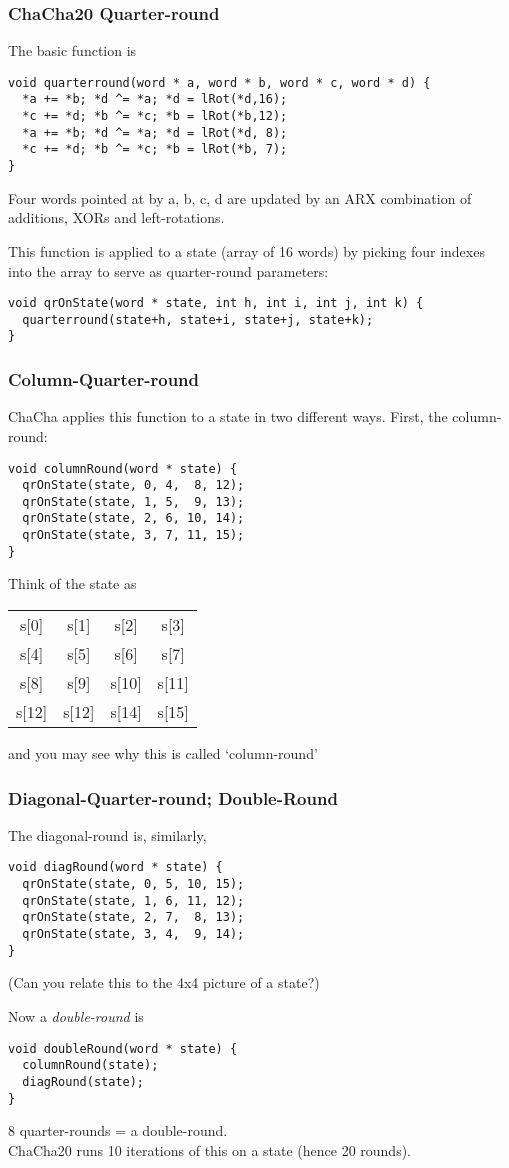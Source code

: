 \documentclass[10pt, hyperref={pdfpagelabels=false}]{beamer}
\begin{document}
\begin{frame} [fragile]
\frametitle{ChaCha20 Quarter-round}
The basic function is
{\color{blue}
\begin{verbatim}
void quarterround(word * a, word * b, word * c, word * d) {
  *a += *b; *d ^= *a; *d = lRot(*d,16);
  *c += *d; *b ^= *c; *b = lRot(*b,12);
  *a += *b; *d ^= *a; *d = lRot(*d, 8);
  *c += *d; *b ^= *c; *b = lRot(*b, 7);
}
\end{verbatim}
}
Four words pointed at by a, b, c, d are updated by an ARX combination of additions, XORs and left-rotations. 

This function is applied to a state (array of 16 words) by picking four indexes into the array to serve as quarter-round parameters:
{\color{blue}
\begin{verbatim}
void qrOnState(word * state, int h, int i, int j, int k) {
  quarterround(state+h, state+i, state+j, state+k);
}
\end{verbatim}
}
\end{frame}

\begin{frame} [fragile]
\frametitle{Column-Quarter-round}
ChaCha applies this function to a state in two different ways. First, the column-round:
{\color{blue}
\begin{verbatim}
void columnRound(word * state) {
  qrOnState(state, 0, 4,  8, 12);
  qrOnState(state, 1, 5,  9, 13);
  qrOnState(state, 2, 6, 10, 14);
  qrOnState(state, 3, 7, 11, 15);
}
\end{verbatim}
}
Think of the state as\\
\begin{tabular}{c c c c} 
s[0] & s[1] & s[2] & s[3]\\
s[4] & s[5] & s[6] & s[7]\\
s[8] & s[9] & s[10] & s[11]\\
s[12] & s[12] & s[14] & s[15]\\
\end{tabular}

and you may see why this is called `column-round'
\end{frame}

\begin{frame} [fragile]
\frametitle{Diagonal-Quarter-round; Double-Round}
The diagonal-round is, similarly,

{\color{blue}
\begin{verbatim}
void diagRound(word * state) {
  qrOnState(state, 0, 5, 10, 15);
  qrOnState(state, 1, 6, 11, 12);
  qrOnState(state, 2, 7,  8, 13);
  qrOnState(state, 3, 4,  9, 14);
}
\end{verbatim}
}
(Can you relate this to the 4x4 picture of a state?)

Now a \emph{double-round} is
{\color{blue}
\begin{verbatim}
void doubleRound(word * state) { 
  columnRound(state);
  diagRound(state);
}
\end{verbatim}
}

8 quarter-rounds = a double-round.\\
ChaCha20 runs 10 iterations of this on a state (hence 20 rounds).
\end{frame}
\end{document}
